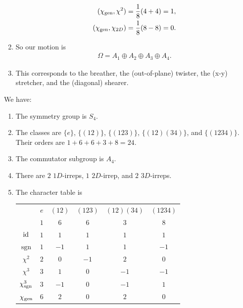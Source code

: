 \documentclass[11pt]{article}
\begin{document}
\begin{eexample}
\begin{enumerate}
\begin{align*}
            (\chi_{\rm gen}, \chi^2) & = \frac{1}{8} (4 + 4) = 1,\\
            (\chi_{\rm gen}, \chi_{2D}) & = \frac{1}{8} (8 - 8) = 0.
        \end{align*}
        \item So our motion is
        \begin{align*}
            \boxed{\Omega = A_1 \oplus A_2 \oplus A_3 \oplus A_4.}
        \end{align*}
        \item This corresponds to the breather, the (out-of-plane) twister, 
        the (x-y) stretcher, and the (diagonal) shearer.
    \end{enumerate}
\end{eexample}

\begin{eexample}
    [Tetrahedron]
    We have:
    \begin{enumerate}
        \item The symmetry group is $S_4$.
        \item The classes are $\{ e \}$, $\{ (12) \}$, $\{ (123) \}$, $\{ (12)(34)\}$, and $\{ (1234) \}$.
        Their orders are $1 + 6 + 6 + 3 + 8 = 24$.
        \item The commutator subgroup is $A_4$.
        \item There are $2$ $1D$-irreps, $1$ $2D$-irrep, and $2$ $3D$-irreps.
        \item The character table is
        \begin{table}[H]
            \centering
            \begin{tabular}{|c|c|c|c|c|c|}
                \hline
                 & $e$ & $(12)$ & $(123)$ & $(12)(34)$ & $(1234)$\\
                 & $1$ & $6$ & $6$ & $3$ & $8$\\
                \hline
                $\operatorname{id}$ & $1$ & $1$ & $1$ & $1$ & $1$\\
                $\operatorname{sgn}$ & $1$ & $-1$ & $1$ & $1$ & $-1$\\
                $\chi^2$ & $2$ & $0$ & $-1$ & $2$ & $0$\\
                $\chi^3$ & $3$ & $1$ & $0$ & $-1$ & $-1$\\    
                $\chi^3_{\rm sgn}$ & $3$ & $-1$ & $0$ & $-1$ & $1$\\
                $\chi_{\rm gen}$ & $6$ & $2$ & $0$ & $2$ & $0$\\
                \hline

\end{tabular}
\end{table}
\end{enumerate}
\end{eexample}
\end{document}
